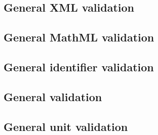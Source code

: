 \subsection*{General XML validation} \begin{sbmlenum}


\end{sbmlenum} \subsection*{General MathML validation} \begin{sbmlenum}



\end{sbmlenum} \subsection*{General identifier validation}  \begin{sbmlenum}


\end{sbmlenum} \subsection*{General  validation} \begin{sbmlenum}


\end{sbmlenum} \subsection*{General unit validation} \begin{sbmlenum}


\end{sbmlenum}
